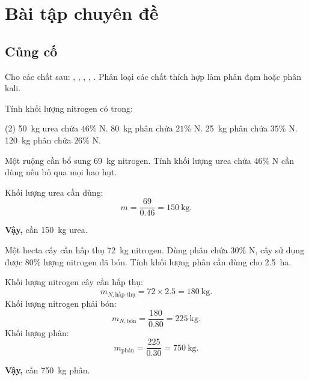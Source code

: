 \section{Bài tập chuyên đề}

\subsection{Củng cố}

\begin{tuluyen}
Cho các chất sau: , , , , . Phân loại các chất thích hợp làm phân đạm hoặc phân kali.
\end{tuluyen}

\begin{tuluyen}
Tính khối lượng nitrogen có trong:
\begin{tasks}(2)
\task \SI{50}{\kilo\gram} urea chứa $46\%$ N.
\task \SI{80}{\kilo\gram} phân chứa $21\%$ N.
\task \SI{25}{\kilo\gram} phân chứa $35\%$ N.
\task \SI{120}{\kilo\gram} phân chứa $26\%$ N.
\end{tasks}
\end{tuluyen}

\begin{tuluyen}
Một ruộng cần bổ sung \SI{69}{\kilo\gram} nitrogen. Tính khối lượng urea chứa $46\%$ N cần dùng nếu bỏ qua mọi hao hụt.
\begin{loigiaiBT}
Khối lượng urea cần dùng:
\[
m=\frac{69}{0.46}=\SI{150}{\kilo\gram}.
\]

\textbf{Vậy,} cần \SI{150}{\kilo\gram} urea.
\end{loigiaiBT}
\end{tuluyen}

\begin{tuluyen}
Một hecta cây cần hấp thụ \SI{72}{\kilo\gram} nitrogen. Dùng phân chứa $30\%$ N, cây sử dụng được $80\%$ lượng nitrogen đã bón. Tính khối lượng phân cần dùng cho \SI{2.5}{\hectare}.
\begin{loigiaiBT}
Khối lượng nitrogen cây cần hấp thụ:
\[
m_{N,\text{hấp thụ}}=72\times2.5=\SI{180}{\kilo\gram}.
\]
Khối lượng nitrogen phải bón:
\[
m_{N,\text{bón}}=\frac{180}{0.80}=\SI{225}{\kilo\gram}.
\]
Khối lượng phân:
\[
m_{\text{phân}}=\frac{225}{0.30}=\SI{750}{\kilo\gram}.
\]

\textbf{Vậy,} cần \SI{750}{\kilo\gram} phân.
\end{loigiaiBT}
\end{tuluyen}

